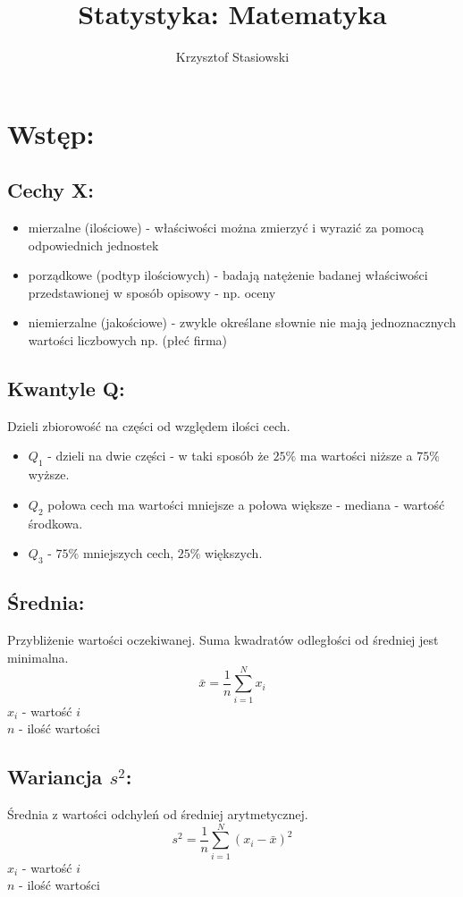\documentclass[fleqn]{article}
\title{Statystyka: Matematyka}
\author{Krzysztof Stasiowski}
\date{}
\begin{document}
\section{Wstęp:}
\subsection{Cechy X:}
\begin{itemize}
\item mierzalne (ilościowe) - właściwości można zmierzyć i wyrazić za pomocą odpowiednich jednostek
\item porządkowe (podtyp ilościowych) - badają natężenie badanej właściwości przedstawionej w sposób opisowy - np. oceny 
\item niemierzalne (jakościowe) - zwykle określane słownie nie mają jednoznacznych wartości liczbowych np. (płeć firma)
\end{itemize}


\subsection{Kwantyle Q:}
Dzieli zbiorowość na części od względem ilości cech. 
\begin{itemize}
\item
$Q_1$ - dzieli na dwie części - w taki sposób że $25\%$ ma wartości niższe a $75\%$ wyższe.
\item
$Q_2$ połowa cech ma wartości mniejsze a połowa większe - mediana - wartość środkowa.  
\item
$Q_3$ - $75\%$ mniejszych cech, $25\%$ większych.
\end{itemize}

\subsection{Średnia:}
Przybliżenie wartości oczekiwanej. Suma kwadratów odległości od średniej jest minimalna.
\[\bar{x} = \frac{1}{n}\sum_{i=1}^Nx_i\]
$x_i$ - wartość $i$\\
$n$ - ilość wartości

\subsection{Wariancja \texorpdfstring{\(s^2\)}{V(X)}:}
Średnia z wartości odchyleń od średniej arytmetycznej.
\[s^2 = \frac{1}{n}\sum_{i=1}^N(x_i-\bar{x})^2\]
$x_i$ - wartość $i$\\
$n$ - ilość wartości
\end{document}
